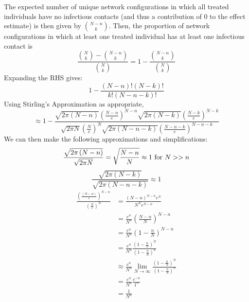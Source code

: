 \documentclass{article}
\theoremstyle{definition}
\begin{document}
The expected number of unique network configurations in which all treated individuals have no infectious contacts (and thus a contribution of 0 to the effect estimate) is then given by $\binom{N-n}{k}$. Then, the proportion of network configurations in which at least one treated individual has at least one infectious contact is 
\begin{equation} 
\frac{{\binom{N}{k}}-{\binom{N-n}{k}}}{{\binom{N}{k}}}=1-\frac{{\binom{N-n}{k}}}{{\binom{N}{k}}}    
\end{equation}
Expanding the RHS gives:
\begin{equation}
1-\frac{\left(N-n\right)!\left(N-k\right)!}{k!\left(N-n-k\right)!}
\end{equation}
Using Stirling's Approximation as appropriate,
\begin{equation}
\approx 1-\frac{\sqrt{2\pi\left(N-n\right)}\left(\frac{N-n}{e}\right)^{N-n}\sqrt{2\pi\left(N-k\right)}\left(\frac{N-k}{e}\right)^{N-k}}{\sqrt{2\pi N}\left(\frac{N}{e}\right)^{N}\sqrt{2\pi \left(N-n-k\right)}\left(\frac{N-n-k}{e}\right)^{N-n-k}}    
\end{equation}
We can then make the following approximations and simplifications:
\begin{equation}
    \frac{\sqrt{2\pi \left(N-n\right)}}{\sqrt{2\pi N}}=\sqrt{\frac{N-n}{N}}\approx 1 \text{ for } N>>n\\
    \end{equation}
    \begin{equation}
    \frac{\sqrt{2 \pi \left(N-k\right)}}{\sqrt{2 \pi \left(N-n-k\right)}}\approx 1
\end{equation}
    \begin{align}
    \frac{\left(\frac{\left(N-n\right)}{e}\right)^{N-n}}{{\left(\frac{N}{e}\right)^{N}}}&=\frac{\left(N-n\right)^{N-n}e^{N}}{N^{N}e^{N-n}}\\
     &=\frac{e^{n}}{N^{n}}\left(\frac{N-n}{N}\right)^{N-n}\\
     &=\frac{e^{n}}{N^{n}}\left(1-\frac{n}{N}\right)^{N-n}\\
     &=\frac{e^{n}}{N^{n}}\frac{\left(1-\frac{n}{N}\right)^{N}}{\left(1-\frac{n}{N}\right)^{n}}\\
     &\approx \frac{e^{n}}{N^{n}}\lim_{N \to \infty}\frac{\left(1-\frac{n}{N}\right)^{N}}{\left(1-\frac{n}{N}\right)^{n}}\\
     &=\frac{e^{n}}{N^{n}}\frac{e^{-n}}{1^{n}}\\
     &=\frac{1}{N^{n}}
\end{align}
\end{document}
